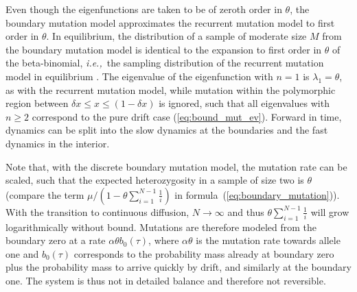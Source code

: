 \documentclass[preprint]{elsarticle}
\newcommand\ie{{\it i.e.,}}
\begin{document}
Even though the eigenfunctions are taken to be of zeroth order in $\theta$, the boundary mutation model approximates the recurrent mutation model to first order in $\theta$. In equilibrium, the distribution of a sample of moderate size $M$ from the boundary mutation model is identical to the expansion to first order in $\theta$ of the beta-binomial, \ie\ the sampling distribution of the recurrent mutation model in equilibrium \citep{Vogl14b}. The eigenvalue of the eigenfunction with $n=1$ is $\lambda_1=\theta$, as with the recurrent mutation model, while mutation within the polymorphic region between $\delta x \leq x \leq (1-\delta x)$ is ignored, such that all eigenvalues with $n\geq 2$ correspond to the pure drift case (\ref{eq:bound_mut_ev}). Forward in time, dynamics can be split into the slow dynamics at the boundaries and the fast dynamics in the interior. 

Note that, with the discrete boundary mutation model, the mutation rate can be scaled, such that the expected heterozygosity in a sample of size two is $\theta$ (compare the term $\mu/(1-\theta\sum_{i=1}^{N-1}\frac{1}{i})$ in formula~(\ref{eq:boundary_mutation})). With the transition to continuous diffusion, $N\to\infty$ and thus $\theta\sum_{i=1}^{N-1}\frac{1}{i}$ will grow logarithmically without bound. Mutations are therefore modeled from the boundary zero at a rate $\alpha\theta b_0(\tau)$, where $\alpha\theta$ is the mutation rate towards allele one and $b_0(\tau)$ corresponds to the probability mass already at boundary zero plus the probability mass to arrive quickly by drift, and similarly at the boundary one. The system is thus not in detailed balance and therefore not reversible.
\end{document}
